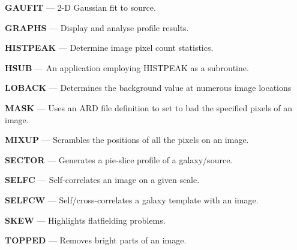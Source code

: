 \documentclass[twoside,11pt]{article}
\begin{document}
{\bf GAUFIT}{ --- 2-D Gaussian fit to source.}
\pageref{des:GAUFIT}

{\bf GRAPHS}{ --- Display and analyse profile results.}
\pageref{des:GRAPHS}

{\bf HISTPEAK}{ --- Determine image pixel count statistics.}
\pageref{des:HISTPEAK}

{\bf HSUB}{ --- An application employing HISTPEAK as a subroutine.}
\pageref{des:HSUB}

{\bf LOBACK}{ --- Determines the background value at numerous image locations}
\pageref{des:LOBACK}

{\bf MASK}{ --- Uses an ARD file definition to set to bad the specified pixels
of an image.}
\pageref{des:MASK}

{\bf MIXUP}{ --- Scrambles the positions of all the pixels on an image.}
\pageref{des:MIXUP}

{\bf SECTOR}{ --- Generates a pie-slice profile of a galaxy/source.}
\pageref{des:SECTOR}

{\bf SELFC}{ --- Self-correlates an image on a given scale.}
\pageref{des:SELFC}

{\bf SELFCW}{ --- Self/cross-correlates a galaxy template with an image.}
\pageref{des:SELFCW}

{\bf SKEW}{ --- Highlights flatfielding problems.}
\pageref{des:SKEW}

{\bf TOPPED}{ --- Removes bright parts of an image.}
\pageref{des:TOPPED}
\end{document}
